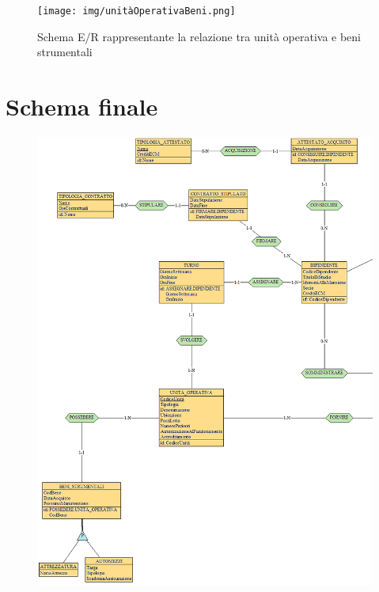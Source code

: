 \documentclass[a4paper, 12pt]{report}
\begin{document}
\begin{figure}[H]
        \centering
        \texttt{[image: img/unitàOperativaBeni.png]}
        \caption{Schema E/R rappresentante la relazione tra unità operativa e beni strumentali}
\end{figure}

\section{Schema finale}

\begin{figure}[H]
        \centering
        \includegraphics[width=1.0\textwidth]{img/ERFinaleSX.png}
\end{figure}
\end{document}
